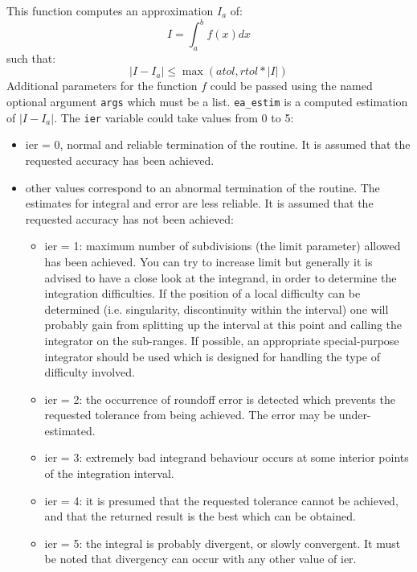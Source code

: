 \begin{mandescription}
This function computes an approximation $I_a$ of:
$$
   I = \int_a^b f(x) dx
$$
such that:
$$
   | I - I_a | \le  \max (atol, rtol*|I|)
$$
Additional parameters for the function $f$ could be passed using the
named optional argument \verb+args+ which must be a
list. \verb+ea_estim+ is a computed estimation of $| I - I_a |$. The
\verb+ier+ variable could take values from 0 to 5: 
\begin{itemize}
\item ier = 0,  normal and reliable termination of the routine. It is assumed that the
      requested  accuracy has been achieved.
\item other values correspond to an abnormal termination of the routine. The estimates
      for integral and error are less reliable. It is assumed that the  requested accuracy
      has not been achieved:
      \begin{itemize}
      \item ier = 1: maximum number of subdivisions (the limit
            parameter) allowed has been achieved. You can try to
            increase limit but generally it is advised to have a close look at the
            integrand, in order to determine the integration
            difficulties. If the position of a local difficulty can
            be determined (i.e.  singularity, discontinuity within
            the interval) one will probably gain from  splitting up
            the interval at this point and calling the integrator
            on the sub-ranges. If possible, an appropriate
            special-purpose integrator should be used which is
            designed for handling the type  of difficulty involved.
      \item ier = 2: the occurrence of roundoff error is detected
            which prevents the requested tolerance from being
            achieved. The error may be under-estimated.
      \item ier = 3: extremely bad integrand behaviour occurs at 
            some interior points of the integration interval.
      \item ier = 4: it is presumed that the requested tolerance 
            cannot be achieved, and that the returned result is the
            best which can be obtained.
      \item ier = 5: the integral is probably divergent, or slowly
            convergent. It must be noted that divergency can occur with
            any other value of ier.
      \end{itemize}
\end{itemize}

\end{mandescription}

